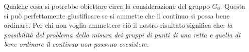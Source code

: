\documentclass{article}
\begin{document}
\medbreak

Qualche cosa si potrebbe obiettare circa la considerazione del gruppo $G_0$. Questa si può perfettamente giustificare se si ammette che il continuo si possa bene ordinare. Per chi non voglia ammettere ciò il nostro risultato significa che: {\em la possibilità del problema della misura dei gruppi di punti di una retta e quella di bene ordinare il continuo non possono coesistere.}
\end{document}
